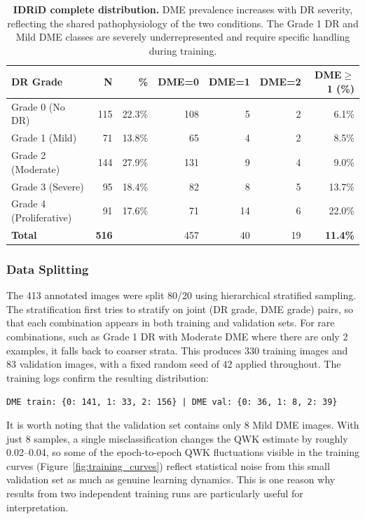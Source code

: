 \documentclass[12pt,a4paper]{article}
\begin{document}
\begin{table}[H]
\centering
\small
\caption{\textbf{IDRiD complete distribution.} DME prevalence increases with DR severity, reflecting the shared pathophysiology of the two conditions. The Grade 1 DR and Mild DME classes are severely underrepresented and require specific handling during training.}
\begin{tabular}{|l|r|r|r|r|r|r|}
\hline
\textbf{DR Grade} & \textbf{N} & \textbf{\%} & \textbf{DME=0} & \textbf{DME=1} & \textbf{DME=2} & \textbf{DME$\geq$1 (\%)} \\
\hline
Grade 0 (No DR) & 115 & 22.3\% & 108 & 5 & 2 & 6.1\% \\
Grade 1 (Mild) & 71 & 13.8\% & 65 & 4 & 2 & 8.5\% \\
Grade 2 (Moderate) & 144 & 27.9\% & 131 & 9 & 4 & 9.0\% \\
Grade 3 (Severe) & 95 & 18.4\% & 82 & 8 & 5 & 13.7\% \\
Grade 4 (Proliferative) & 91 & 17.6\% & 71 & 14 & 6 & 22.0\% \\
\hline
\textbf{Total} & \textbf{516} & & 457 & 40 & 19 & \textbf{11.4\%} \\
\hline
\end{tabular}
\end{table}

\subsubsection{Data Splitting}

The 413 annotated images were split 80/20 using hierarchical stratified sampling. The stratification first tries to stratify on joint (DR grade, DME grade) pairs, so that each combination appears in both training and validation sets. For rare combinations, such as Grade 1 DR with Moderate DME where there are only 2 examples, it falls back to coarser strata. This produces 330 training images and 83 validation images, with a fixed random seed of 42 applied throughout. The training logs confirm the resulting distribution:

\begin{center}
\texttt{DME train: \{0: 141, 1: 33, 2: 156\} | DME val: \{0: 36, 1: 8, 2: 39\}}
\end{center}

It is worth noting that the validation set contains only 8 Mild DME images. With just 8 samples, a single misclassification changes the QWK estimate by roughly 0.02--0.04, so some of the epoch-to-epoch QWK fluctuations visible in the training curves (Figure~\ref{fig:training_curves}) reflect statistical noise from this small validation set as much as genuine learning dynamics. This is one reason why results from two independent training runs are particularly useful for interpretation.
\end{document}
